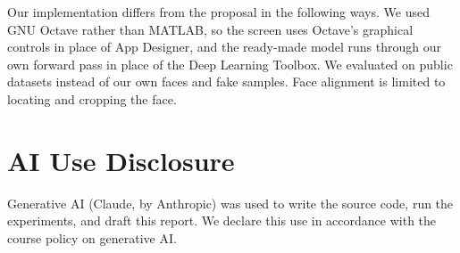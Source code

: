 \documentclass[conference,a4paper]{IEEEtran}
\begin{document}
Our implementation differs from the proposal in the following ways. We used GNU Octave rather than MATLAB, so the screen uses Octave's graphical controls in place of App Designer, and the ready-made model runs through our own forward pass in place of the Deep Learning Toolbox. We evaluated on public datasets instead of our own faces and fake samples. Face alignment is limited to locating and cropping the face.

\section*{AI Use Disclosure}
Generative AI (Claude, by Anthropic) was used to write the source code, run the experiments, and draft this report. We declare this use in accordance with the course policy on generative AI.
\end{document}
